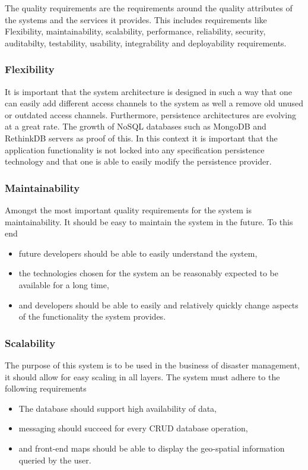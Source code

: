 The quality requirements are the requirements around the quality attributes of the systems and
the services it provides. This includes requirements like Flexibility, maintainability, scalability, performance, reliability, security, auditabilty, testability, usability, integrability and deployability requirements.

\subsubsection{Flexibility}  
It is important that the system architecture is designed in such a way that one can easily add different access channels to the system as well a remove old unused or outdated access channels. Furthermore, persistence architectures are evolving at a great rate. The growth of NoSQL databases such as MongoDB and RethinkDB servers as proof of this. In this context it is important that the application functionality is not locked into any specification persistence technology and that one is able to easily modify the persistence provider.

\subsubsection{Maintainability}
Amongst the most important quality requirements for the system is maintainability. It should be easy to maintain the system in the future. To this end
\begin{itemize}
\item future developers should be able to easily understand the system,
\item the technologies chosen for the system an be reasonably expected to be available for a long time,
\item and developers should be able to easily and relatively quickly change aspects of the functionality the system provides.
\end{itemize}

\subsubsection{Scalability}
The purpose of this system is to be used in the business of disaster management, it should allow
for easy scaling in all layers. The system must adhere to the following requirements  
\begin{itemize}
\item The database should support high availability of data,
\item messaging should succeed for every CRUD database operation,
\item and front-end maps should be able to display the geo-spatial information queried by the user.
\end{itemize}

